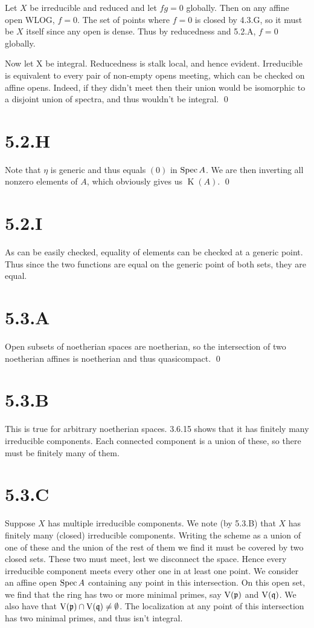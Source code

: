 \documentclass{article}
\begin{document}
Let $X$ be irreducible and reduced and let $fg=0$ globally. Then on any affine open WLOG, $f=0$. The set of points where $f=0$ is closed by 4.3.G, so it must be $X$ itself since any open is dense. Thus by reducedness and 5.2.A, $f=0$ globally.

Now let X be integral. Reducedness is stalk local, and hence evident. Irreducible is equivalent to every pair of non-empty opens meeting, which can be checked on affine opens. Indeed, if they didn't meet then their union would be isomorphic to a disjoint union of spectra, and thus wouldn't be integral. \qed

\section{5.2.H}
Note that $\eta$ is generic and thus equals $(0)$ in $\operatorname{Spec} A$. We are then inverting all nonzero elements of $A$, which obviously gives us $\operatorname{K}(A)$. \qed

\section{5.2.I}
As can be easily checked, equality of elements can be checked at a generic point. Thus since the two functions are equal on the generic point of both sets, they are equal.

\section{5.3.A}
Open subsets of noetherian spaces are noetherian, so the intersection of two noetherian affines is noetherian and thus quasicompact. \qed

\section{5.3.B}
This is true for arbitrary noetherian spaces. 3.6.15 shows that it has finitely many irreducible components. Each connected component is a union of these, so there must be finitely many of them.

\section{5.3.C}
Suppose $X$ has multiple irreducible components. We note (by 5.3.B) that $X$ has finitely many (closed) irreducible components. Writing the scheme as a union of one of these and the union of the rest of them we find it must be covered by two closed sets. These two must meet, lest we disconnect the space. Hence every irreducible component meets every other one in at least one point. We consider an affine open $\operatorname{Spec} A$ containing any point in this intersection. On this open set, we find that the ring has two or more minimal primes, say $\operatorname{V}(\mathfrak{p})$ and $\operatorname{V}(\mathfrak{q})$. We also have that $\operatorname{V}(\mathfrak{p}) \cap \operatorname{V}(\mathfrak{q})\neq \emptyset$. The localization at any point of this intersection has two minimal primes, and thus isn't integral.
\end{document}

